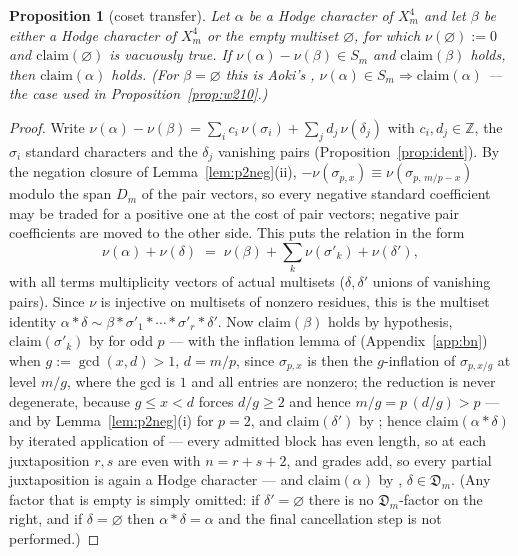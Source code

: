 \documentclass[11pt]{amsart}
\newtheorem{proposition}[theorem]{Proposition}
\theoremstyle{remark}
\newcommand{\Z}{\mathbb{Z}}
\begin{document}
\begin{proposition}[coset transfer]\label{prop:coset}
Let $\alpha$ be a Hodge character of $X^4_m$ and let $\beta$ be either a Hodge character of
$X^4_m$ or the empty multiset $\varnothing$, for which $\nu(\varnothing):=0$ and
$\mathrm{claim}(\varnothing)$ is vacuously true. If $\nu(\alpha)-\nu(\beta)\in S_m$ and
$\mathrm{claim}(\beta)$ holds, then $\mathrm{claim}(\alpha)$ holds. (For
$\beta=\varnothing$ this is Aoki's \cite[Lemma~4.1(iii)]{Aoki00},
$\nu(\alpha)\in S_m\Rightarrow\mathrm{claim}(\alpha)$ --- the case used in
Proposition~\ref{prop:w210}.)
\end{proposition}
\begin{proof}
Write $\nu(\alpha)-\nu(\beta)=\sum_i c_i\,\nu(\sigma_i)+\sum_j d_j\,\nu(\delta_j)$
with $c_i,d_j\in\Z$, the $\sigma_i$ standard characters and the $\delta_j$ vanishing pairs
(Proposition~\ref{prop:ident}). By the negation closure of Lemma~\ref{lem:p2neg}(ii),
$-\nu(\sigma_{p,x})\equiv\nu(\sigma_{p,\,m/p-x})$ modulo the span $D_m$ of the pair
vectors, so every negative standard coefficient may be traded for a positive one at the cost of
pair vectors; negative pair coefficients are moved to the other side. This puts the relation in
the form
\[
\nu(\alpha)+\nu(\delta)\;=\;\nu(\beta)+\sum_k\nu(\sigma'_k)+\nu(\delta'),
\]
with all terms multiplicity vectors of actual multisets ($\delta,\delta'$ unions of vanishing
pairs). Since $\nu$ is injective on multisets of nonzero residues, this is the multiset identity
$\alpha*\delta\sim\beta*\sigma'_1*\cdots*\sigma'_r*\delta'$. Now
$\mathrm{claim}(\beta)$ holds by hypothesis, $\mathrm{claim}(\sigma'_k)$ by
\cite[Thm.~2-1]{Aoki87} for odd $p$ --- with the inflation lemma of \cite{BN}
(Appendix~\ref{app:bn}) when $g:=\gcd(x,d)>1$, $d=m/p$, since $\sigma_{p,x}$ is then the
$g$-inflation of $\sigma_{p,x/g}$ at level $m/g$, where the gcd is $1$ and all entries are
nonzero; the reduction is never degenerate, because $g\le x<d$ forces $d/g\ge2$ and hence
$m/g=p\,(d/g)>p$ --- and by Lemma~\ref{lem:p2neg}(i) for $p=2$, and
$\mathrm{claim}(\delta')$ by \cite[Thm.~1-1]{Aoki87}; hence
$\mathrm{claim}(\alpha*\delta)$ by iterated application of \cite[Thm.~1-4(i)]{Aoki87} --- every
admitted block has even length, so at each juxtaposition $r,s$ are even with $n=r+s+2$, and
grades add, so every partial juxtaposition is again a Hodge character --- and
$\mathrm{claim}(\alpha)$ by \cite[Thm.~1-4(ii)]{Aoki87}, $\delta\in\mathfrak D_m$. (Any
factor that is empty is simply omitted: if $\delta'=\varnothing$ there is no $\mathfrak
D_m$-factor on the right, and if $\delta=\varnothing$ then $\alpha*\delta=\alpha$ and the
final cancellation step is not performed.)
\end{proof}
\end{document}

